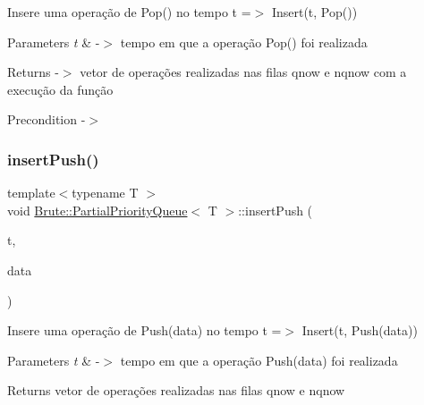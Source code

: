 Insere uma operação de Pop() no tempo t =$>$ Insert(t, Pop())


\begin{DoxyParams}{Parameters}
{\em t} & -\/$>$ tempo em que a operação Pop() foi realizada \\
\hline
\end{DoxyParams}
\begin{DoxyReturn}{Returns}
-\/$>$ vetor de operações realizadas nas filas qnow e nqnow com a execução da função 
\end{DoxyReturn}
\begin{DoxyPrecond}{Precondition}
-\/$>$ 
\end{DoxyPrecond}
\mbox{\label{classBrute_1_1PartialPriorityQueue_a67fca61de9266a9df9a59d327e2743d5}} 
\subsubsection{\texorpdfstring{insert\+Push()}{insertPush()}}
{\footnotesize\ttfamily template$<$typename T $>$ \\
void \hyperlink{classBrute_1_1PartialPriorityQueue}{Brute\+::\+Partial\+Priority\+Queue}$<$ T $>$\+::insert\+Push (\begin{DoxyParamCaption}\item[{int}]{t,  }\item[{T}]{data }\end{DoxyParamCaption})}

Insere uma operação de Push(data) no tempo t =$>$ Insert(t, Push(data))


\begin{DoxyParams}{Parameters}
{\em t} & -\/$>$ tempo em que a operação Push(data) foi realizada \\
\hline
\end{DoxyParams}
\begin{DoxyReturn}{Returns}
vetor de operações realizadas nas filas qnow e nqnow 
\end{DoxyReturn}
\mbox{\label{classBrute_1_1PartialPriorityQueue_a74a0cac80a46b861a3869473c9b9def8}} 
